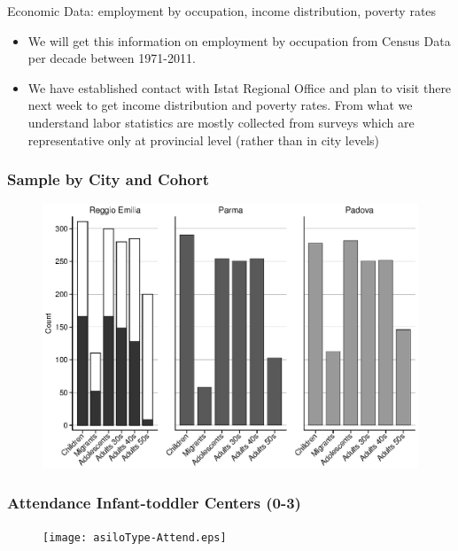\begin{frame}
\begin{block}{Economic Data: employment by occupation, income distribution, poverty rates}
\begin{itemize}
\item We will get this information on employment by occupation from Census Data per decade between 1971-2011.
\item We have established contact with Istat Regional Office and plan to visit there next week to get income distribution and poverty rates. From what we understand labor statistics are mostly collected from surveys which are representative only at provincial level (rather than in city levels) 
 
\end{itemize}
\end{block}
\end{frame}
\begin{frame} 
\frametitle{Sample by City and Cohort}
\begin{figure}[H]
\begin{center}
	\includegraphics[width=.8\textwidth]{./include/sample}
\end{center}
\end{figure}
\end{frame}
\begin{frame}
\frametitle{Attendance Infant-toddler Centers (0-3)} 
\begin{center}
\begin{figure}
\texttt{[image: asiloType-Attend.eps]}
\end{figure}
\end{center}
\end{frame}
